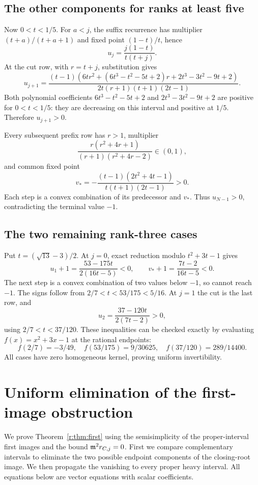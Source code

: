\documentclass[11pt,a4paper]{article}
\numberwithin{equation}{section}
\theoremstyle{definition}\newtheorem{definition}[theorem]{Definition}
\theoremstyle{remark}\newtheorem{remark}[theorem]{Remark}
\begin{document}
\subsection{The other components for ranks at least five}

Now \(0<t<1/5\). For \(a<j\), the suffix recurrence has multiplier
\((t+a)/(t+a+1)\) and fixed point \((1-t)/t\), hence
\[
                         u_j=\frac{j(1-t)}{t(t+j)}.
\]
At the cut row, with \(r=t+j\), substitution gives
\[
 u_{j+1}=
 \frac{(t-1)\left(6tr^2+(6t^3-t^2-5t+2)r
                         +2t^3-3t^2-9t+2\right)}
      {2t(r+1)(t+1)(2t-1)}.
\]
Both polynomial coefficients
\(6t^3-t^2-5t+2\) and \(2t^3-3t^2-9t+2\) are positive for
\(0<t<1/5\): they are decreasing on this interval and positive
at \(1/5\). Therefore \(u_{j+1}>0\).

Every subsequent prefix row has \(r>1\), multiplier
\[
    \frac{r(r^2+4r+1)}{(r+1)(r^2+4r-2)}\in(0,1),
\]
and common fixed point
\[
                 v_*=-\frac{(t-1)(2t^2+4t-1)}
                                  {t(t+1)(2t-1)}>0.
\]
Each step is a convex combination of its predecessor and \(v_*\).
Thus \(u_{N-1}>0\), contradicting the terminal value \(-1\).

\subsection{The two remaining rank-three cases}

Put \(t=(\sqrt{13}-3)/2\). At \(j=0\), exact reduction modulo
\(t^2+3t-1\) gives
\[
 u_1+1=\frac{53-175t}{2(16t-5)}<0,\qquad
 v_*+1=\frac{7t-2}{16t-5}<0.
\]
The next step is a convex combination of two values below \(-1\),
so cannot reach \(-1\). The signs follow from
\(2/7<t<53/175<5/16\).
At \(j=1\) the cut is the last row, and
\[
                 u_2=\frac{37-120t}{2(7t-2)}>0,
\]
using \(2/7<t<37/120\).
These inequalities can be checked exactly by evaluating
\(f(x)=x^2+3x-1\) at the rational endpoints:
\[
 f(2/7)=-3/49,\quad
 f(53/175)=9/30625,\quad
 f(37/120)=289/14400.
\]
All cases have zero homogeneous kernel, proving uniform
invertibility.

\section{Uniform elimination of the first-image obstruction}
\label{r:app:first}

We prove Theorem~\ref{r:thm:first} using the semisimplicity of the
proper-interval first images and the bound \(\mathfrak m^2r_{C,j}=0\).
First we compare complementary intervals to eliminate the two
possible endpoint components of the closing-root image.  We then
propagate the vanishing to every proper heavy interval.
All equations below are vector equations with scalar coefficients.
\end{document}
